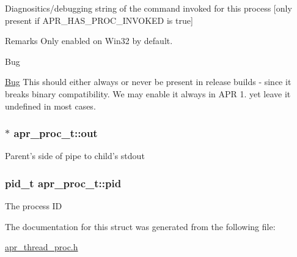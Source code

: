 Diagnositics/debugging string of the command invoked for this process \mbox{[}only present if A\-P\-R\-\_\-\-H\-A\-S\-\_\-\-P\-R\-O\-C\-\_\-\-I\-N\-V\-O\-K\-E\-D is true\mbox{]} \begin{DoxyRemark}{Remarks}
Only enabled on Win32 by default. 
\end{DoxyRemark}
\begin{DoxyRefDesc}{Bug}
\item[\hyperlink{bug__bug000011}{Bug}]This should either always or never be present in release builds -\/ since it breaks binary compatibility. We may enable it always in A\-P\-R 1. yet leave it undefined in most cases. \end{DoxyRefDesc}
\hypertarget{structapr__proc__t_acb7d7c5226217946d761f0e90ff70d24}{
\subsubsection[{out}]{$\ast$ apr\-\_\-proc\-\_\-t\-::out}}\label{structapr__proc__t_acb7d7c5226217946d761f0e90ff70d24}
Parent's side of pipe to child's stdout \hypertarget{structapr__proc__t_a8a8ee4b234156485a72497023e7482e5}{
\subsubsection[{pid}]{\setlength{\rightskip}{0pt plus 5cm}pid\-\_\-t apr\-\_\-proc\-\_\-t\-::pid}}\label{structapr__proc__t_a8a8ee4b234156485a72497023e7482e5}
The process I\-D 

The documentation for this struct was generated from the following file\-:\begin{DoxyCompactItemize}
\item 
\hyperlink{apr__thread__proc_8h}{apr\-\_\-thread\-\_\-proc.\-h}\end{DoxyCompactItemize}
